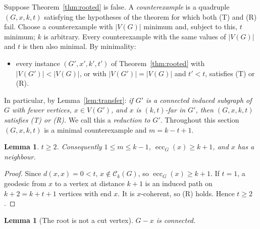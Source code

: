 \documentclass[11pt,a4paper]{article}
\newtheorem{lemma}[theorem]{Lemma}
\theoremstyle{definition}
\newcommand{\ecc}{\operatorname{ecc}}
\newcommand{\C}{\mathcal{C}}
\begin{document}
Suppose Theorem~\ref{thm:rooted} is false. A \emph{counterexample} is a quadruple $(G,x,k,t)$ satisfying the hypotheses of the theorem for which both (T) and (R) fail. Choose a counterexample with $|V(G)|$ minimum and, subject to this, $t$ minimum; $k$ is arbitrary. Every counterexample with the same values of $|V(G)|$ and $t$ is then also minimal. By minimality:
\begin{itemize}
\item[$(\ast)$] every instance $(G',x',k',t')$ of Theorem~\ref{thm:rooted} with $|V(G')|<|V(G)|$, or with $|V(G')|=|V(G)|$ and $t'<t$, satisfies (T) or (R).
\end{itemize}
In particular, by Lemma~\ref{lem:transfer}: \emph{if $G'$ is a connected induced subgraph of $G$ with fewer vertices, $x\in V(G')$, and $x$ is $(k,t)$-far in $G'$, then $(G,x,k,t)$ satisfies (T) or (R).} We call this a \emph{reduction to $G'$}. Throughout this section $(G,x,k,t)$ is a minimal counterexample and $m=k-t+1$.

\begin{lemma}\label{lem:t2}
$t\ge2$. Consequently $1\le m\le k-1$, $\ecc_G(x)\ge k+1$, and $x$ has a neighbour.
\end{lemma}

\begin{proof}
Since $d(x,x)=0<t$, $x\notin\C_k(G)$, so $\ecc_G(x)\ge k+1$. If $t=1$, a geodesic from $x$ to a vertex at distance $k+1$ is an induced path on $k+2=k+t+1$ vertices with end $x$. It is $x$-coherent, so (R) holds. Hence $t\ge2$.
\end{proof}

\begin{lemma}[The root is not a cut vertex]\label{lem:noncut}
$G-x$ is connected.
\end{lemma}
\end{document}
